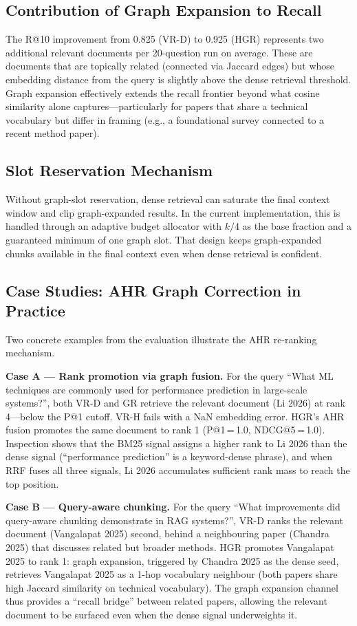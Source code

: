 \documentclass[conference,10pt,twocolumn]{IEEEtran}
\begin{document}
\subsection{Contribution of Graph Expansion to Recall}

The R@10 improvement from 0.825 (VR-D) to 0.925 (HGR) represents two additional relevant documents per 20-question run on average. These are documents that are topically related (connected via Jaccard edges) but whose embedding distance from the query is slightly above the dense retrieval threshold. Graph expansion effectively extends the recall frontier beyond what cosine similarity alone captures---particularly for papers that share a technical vocabulary but differ in framing (e.g., a foundational survey connected to a recent method paper).

\subsection{Slot Reservation Mechanism}

Without graph-slot reservation, dense retrieval can saturate the final context window and clip graph-expanded results. In the current implementation, this is handled through an adaptive budget allocator with $k/4$ as the base fraction and a guaranteed minimum of one graph slot. That design keeps graph-expanded chunks available in the final context even when dense retrieval is confident.

\subsection{Case Studies: AHR Graph Correction in Practice}

Two concrete examples from the evaluation illustrate the AHR re-ranking mechanism.

\textbf{Case A --- Rank promotion via graph fusion.} For the query ``What ML techniques are commonly used for performance prediction in large-scale systems?'', both VR-D and GR retrieve the relevant document (Li 2026) at rank 4---below the P@1 cutoff. VR-H fails with a NaN embedding error. HGR's AHR fusion promotes the same document to rank 1 (P@1\,=\,1.0, NDCG@5\,=\,1.0). Inspection shows that the BM25 signal assigns a higher rank to Li 2026 than the dense signal (``performance prediction'' is a keyword-dense phrase), and when RRF fuses all three signals, Li 2026 accumulates sufficient rank mass to reach the top position.

\textbf{Case B --- Query-aware chunking.} For the query ``What improvements did query-aware chunking demonstrate in RAG systems?'', VR-D ranks the relevant document (Vangalapat 2025) second, behind a neighbouring paper (Chandra 2025) that discusses related but broader methods. HGR promotes Vangalapat 2025 to rank 1: graph expansion, triggered by Chandra 2025 as the dense seed, retrieves Vangalapat 2025 as a 1-hop vocabulary neighbour (both papers share high Jaccard similarity on technical vocabulary). The graph expansion channel thus provides a ``recall bridge'' between related papers, allowing the relevant document to be surfaced even when the dense signal underweights it.
\end{document}
